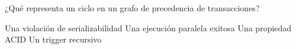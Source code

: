 \question[1] ¿Qué representa un ciclo en un grafo de precedencia de transacciones?
\begin{choices}
\CorrectChoice Una violación de serializabilidad
\choice Una ejecución paralela exitosa
\choice Una propiedad ACID
\choice Un trigger recursivo
\end{choices}